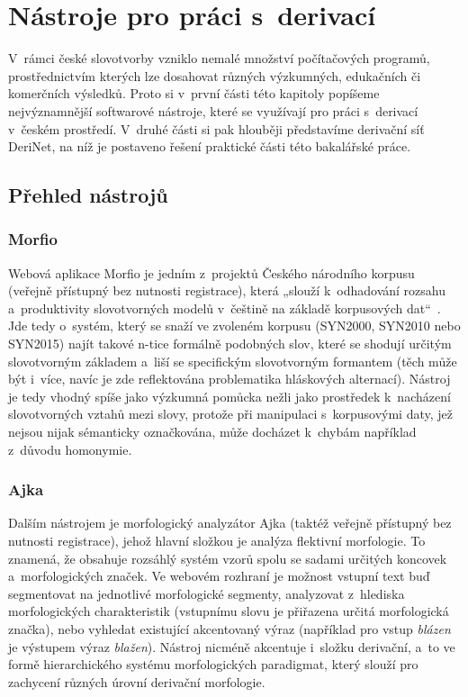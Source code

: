 \hypertarget{nuxe1stroje-pro-pruxe1ci-s-derivacuxed}{%
\chapter{Nástroje pro práci
s~derivací}\label{nuxe1stroje-pro-pruxe1ci-s-derivacuxed}}

V~rámci české slovotvorby vzniklo nemalé množství počítačových programů,
prostřednictvím kterých lze dosahovat různých výzkumných, edukačních či
komerčních výsledků. Proto si v~první části této kapitoly popíšeme
nejvýznamnější softwarové nástroje, které se využívají pro práci
s~derivací v~českém prostředí. V~druhé části si pak hlouběji představíme
derivační síť DeriNet, na níž je postaveno řešení praktické části této
bakalářské práce.

\hypertarget{pux159ehled-nuxe1strojux16f}{%
\section{Přehled nástrojů}\label{pux159ehled-nuxe1strojux16f}}

\hypertarget{morfio}{%
\subsection{Morfio}\label{morfio}}

Webová aplikace Morfio je jedním z~projektů Českého národního korpusu
(veřejně přístupný bez nutnosti registrace), která „slouží k~odhadování
rozsahu a~produktivity slovotvorných modelů v~češtině na základě
korpusových dat``~\parencite{cvrcek13}. Jde tedy o~systém, který se
snaží ve zvoleném korpusu (SYN2000, SYN2010 nebo SYN2015) najít takové
n-tice formálně podobných slov, které se shodují určitým slovotvorným
základem a~liší se specifickým slovotvorným formantem (těch může být
i~více, navíc je zde reflektována problematika hláskových alternací).
Nástroj je tedy vhodný spíše jako výzkumná pomůcka nežli jako prostředek
k~nacházení slovotvorných vztahů mezi slovy, protože při manipulaci
s~korpusovými daty, jež nejsou nijak sémanticky označkována, může docházet
k~chybám například z~důvodu homonymie.~\parencite{cvrcek13}

\hypertarget{ajka}{%
\subsection{Ajka}\label{ajka}}

Dalším nástrojem je morfologický analyzátor Ajka (taktéž veřejně
přístupný bez nutnosti registrace), jehož hlavní složkou je analýza
flektivní morfologie. To znamená, že obsahuje rozsáhlý systém vzorů
spolu se sadami určitých koncovek a~morfologických značek. Ve webovém
rozhraní je možnost vstupní text buď segmentovat na jednotlivé
morfologické segmenty, analyzovat z~hlediska morfologických
charakteristik (vstupnímu slovu je přiřazena určitá morfologická
značka), nebo vyhledat existující akcentovaný výraz (například pro vstup
\emph{blázen} je výstupem výraz \emph{blažen}). Nástroj nicméně
akcentuje i~složku derivační, a~to ve formě hierarchického systému
morfologických paradigmat, který slouží pro zachycení různých úrovní
derivační morfologie.~\parencite{ajka}

